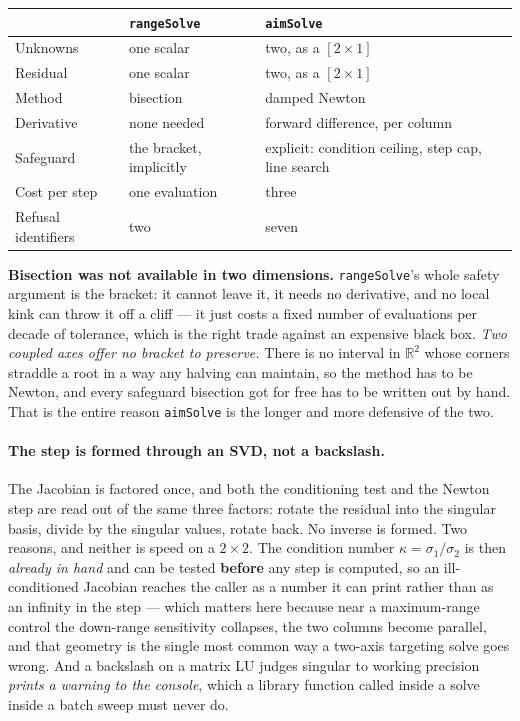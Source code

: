 \documentclass[11pt]{article}
\newcommand{\code}[1]{\texttt{#1}}
\begin{document}
\begin{center}
\begin{tabular}{lll}
\toprule
 & \code{rangeSolve} & \code{aimSolve} \\
\midrule
Unknowns             & one scalar                 & two, as a $[2\times1]$ \\
Residual             & one scalar                 & two, as a $[2\times1]$ \\
Method               & bisection                  & damped Newton \\
Derivative           & none needed                & forward difference, per column \\
Safeguard            & the bracket, implicitly    & explicit: condition ceiling, step cap, line search \\
Cost per step        & one evaluation             & three \\
Refusal identifiers  & two                        & seven \\
\bottomrule
\end{tabular}
\end{center}

\textbf{Bisection was not available in two dimensions.} \code{rangeSolve}'s
whole safety argument is the bracket: it cannot leave it, it needs no
derivative, and no local kink can throw it off a cliff --- it just costs a
fixed number of evaluations per decade of tolerance, which is the right trade
against an expensive black box. \emph{Two coupled axes offer no bracket to
preserve.} There is no interval in $\mathbb{R}^2$ whose corners straddle a root
in a way any halving can maintain, so the method has to be Newton, and every
safeguard bisection got for free has to be written out by hand. That is the
entire reason \code{aimSolve} is the longer and more defensive of the two.

\paragraph{The step is formed through an SVD, not a backslash.} The Jacobian is
factored once, and both the conditioning test and the Newton step are read out
of the same three factors: rotate the residual into the singular basis, divide
by the singular values, rotate back. No inverse is formed. Two reasons, and
neither is speed on a $2\times2$. The condition number
$\kappa = \sigma_1/\sigma_2$ is then \emph{already in hand} and can be tested
\textbf{before} any step is computed, so an ill-conditioned Jacobian reaches
the caller as a number it can print rather than as an infinity in the step ---
which matters here because near a maximum-range control the down-range
sensitivity collapses, the two columns become parallel, and that geometry is
the single most common way a two-axis targeting solve goes wrong. And a
backslash on a matrix LU judges singular to working precision \emph{prints a
warning to the console}, which a library function called inside a solve inside
a batch sweep must never do.
\end{document}

